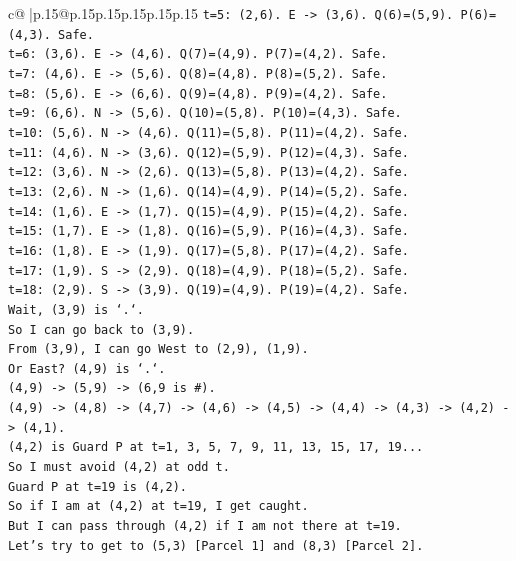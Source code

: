 \documentclass{article}
\begin{document}
{\begin{supertabular}{c@{$\;$}|p{.15\linewidth}@{}p{.15\linewidth}p{.15\linewidth}p{.15\linewidth}p{.15\linewidth}p{.15\linewidth}}
{{{\texttt{t=5: (2,6). E {-}> (3,6). Q(6)=(5,9). P(6)=(4,3). Safe.} \\
\texttt{t=6: (3,6). E {-}> (4,6). Q(7)=(4,9). P(7)=(4,2). Safe.} \\
\texttt{t=7: (4,6). E {-}> (5,6). Q(8)=(4,8). P(8)=(5,2). Safe.} \\
\texttt{t=8: (5,6). E {-}> (6,6). Q(9)=(4,8). P(9)=(4,2). Safe.} \\
\texttt{t=9: (6,6). N {-}> (5,6). Q(10)=(5,8). P(10)=(4,3). Safe.} \\
\texttt{t=10: (5,6). N {-}> (4,6). Q(11)=(5,8). P(11)=(4,2). Safe.} \\
\texttt{t=11: (4,6). N {-}> (3,6). Q(12)=(5,9). P(12)=(4,3). Safe.} \\
\texttt{t=12: (3,6). N {-}> (2,6). Q(13)=(5,8). P(13)=(4,2). Safe.} \\
\texttt{t=13: (2,6). N {-}> (1,6). Q(14)=(4,9). P(14)=(5,2). Safe.} \\
\texttt{t=14: (1,6). E {-}> (1,7). Q(15)=(4,9). P(15)=(4,2). Safe.} \\
\texttt{t=15: (1,7). E {-}> (1,8). Q(16)=(5,9). P(16)=(4,3). Safe.} \\
\texttt{t=16: (1,8). E {-}> (1,9). Q(17)=(5,8). P(17)=(4,2). Safe.} \\
\texttt{t=17: (1,9). S {-}> (2,9). Q(18)=(4,9). P(18)=(5,2). Safe.} \\
\texttt{t=18: (2,9). S {-}> (3,9). Q(19)=(4,9). P(19)=(4,2). Safe.} \\
\texttt{Wait, (3,9) is `.`.} \\
\texttt{So I can go back to (3,9).} \\
\texttt{From (3,9), I can go West to (2,9), (1,9).} \\
\texttt{Or East? (4,9) is `.`.} \\
\texttt{(4,9) {-}> (5,9) {-}> (6,9 is \#).} \\
\texttt{(4,9) {-}> (4,8) {-}> (4,7) {-}> (4,6) {-}> (4,5) {-}> (4,4) {-}> (4,3) {-}> (4,2) {-}> (4,1).} \\
\texttt{(4,2) is Guard P at t=1, 3, 5, 7, 9, 11, 13, 15, 17, 19...} \\
\texttt{So I must avoid (4,2) at odd t.} \\
\texttt{Guard P at t=19 is (4,2).} \\
\texttt{So if I am at (4,2) at t=19, I get caught.} \\
\texttt{But I can pass through (4,2) if I am not there at t=19.} \\
\texttt{Let's try to get to (5,3) {[}Parcel 1{]} and (8,3) {[}Parcel 2{]}.} \\
}}}
\end{supertabular}}
\end{document}
